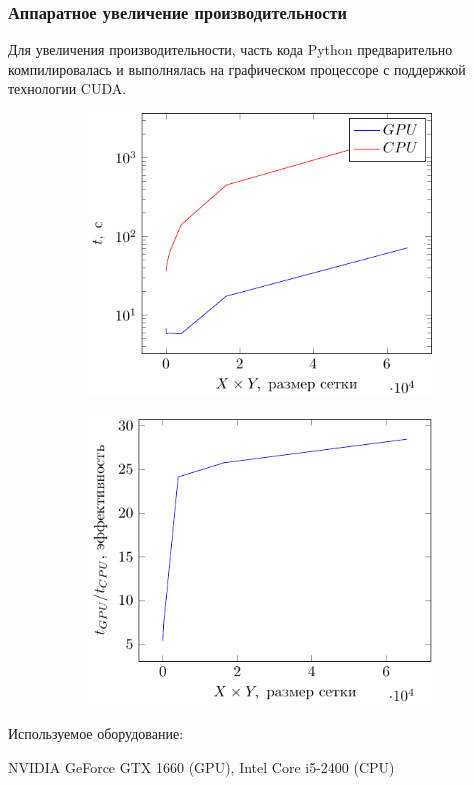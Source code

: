 \documentclass[10pt,pdf,hyperref={unicode}, dvipsnames]{beamer}
\begin{document}
\begin{frame}[t]
	\frametitle{Аппаратное увеличение производительности}
    Для увеличения производительности, часть кода Python
    предварительно компилировалась и выполнялась на графическом процессоре с
    поддержкой технологии CUDA. 
    \begin{figure}[h]
        \begin{subfigure}{0.49\linewidth}
            \centering
            \includegraphics[width=\linewidth]{fig/water/gpucpu.pdf}
        \end{subfigure}
        \begin{subfigure}{0.49\linewidth}
            \centering
            \includegraphics[width=\linewidth]{fig/water/gpucpu1.pdf}
        \end{subfigure}
    \end{figure}
    Используемое оборудование: 

    NVIDIA GeForce GTX 1660 (GPU),
    Intel Core i5-2400 (CPU)
\end{frame}
\end{document}
